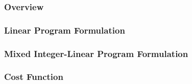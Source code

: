 \subsubsection{Overview}


\subsubsection{Linear Program Formulation}


\subsubsection{Mixed Integer-Linear Program Formulation}


\subsubsection{Cost Function}


